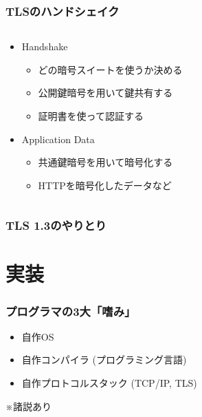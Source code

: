 \documentclass[dvipdfmx, 12pt]{beamer}
\begin{document}
\begin{frame}
  \frametitle{TLSのハンドシェイク}

  \begin{columns}
    \begin{column}{.7\textwidth}
      \begin{itemize}
        \item Handshake
        \begin{itemize}
          \item どの暗号スイートを使うか決める
          \item \alert{公開鍵暗号}を用いて鍵共有する
          \item 証明書を使って認証する
        \end{itemize}
        \vspace{0.5cm}
        \item Application Data
        \begin{itemize}
          \item \alert{共通鍵暗号}を用いて暗号化する
          \item HTTPを暗号化したデータなど
        \end{itemize}
      \end{itemize}
    \end{column}
    \begin{column}{.3\textwidth}
      \begin{figure}
        \footnotesize
        \centering
        
      \end{figure}
    \end{column}
  \end{columns}
\end{frame}

\begin{frame}
  \frametitle{TLS 1.3のやりとり}

  \begin{figure}
    \centering
    
  \end{figure}
\end{frame}

\section{実装} %
\begin{frame}
  \frametitle{プログラマの3大「嗜み」}

  \begin{itemize}
    \item 自作OS
    \vspace{5mm}
    \item 自作コンパイラ (プログラミング言語)
    \vspace{5mm}
    \item 自作プロトコルスタック (TCP/IP, TLS)
  \end{itemize}
  \vspace{5mm}

  \begin{center}
    \alert{※諸説あり}
  \end{center}
\end{frame}
\end{document}
